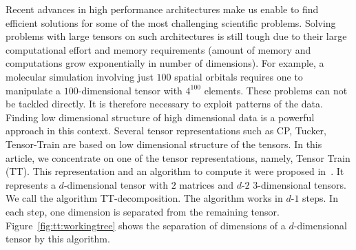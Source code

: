 \documentclass[sigconf]{acmart}
\begin{document}

Recent advances in high performance architectures make us enable to find efficient solutions for some of the most challenging scientific problems. Solving problems with large tensors on such architectures is still tough due to their large computational effort and memory requirements (amount of memory and computations grow exponentially in number of dimensions). For example, a molecular simulation involving just $100$ spatial orbitals requires one to manipulate a $100$-dimensional tensor with $4^{100}$ elements. These problems can not be tackled directly. It is therefore necessary to exploit patterns of the data. Finding low dimensional structure of high dimensional data is a powerful approach in this context. Several tensor representations such as CP, Tucker, Tensor-Train are based on low dimensional structure of the tensors. In this article, we concentrate on one of the tensor representations, namely, Tensor Train (TT). This representation and an algorithm to compute it were proposed in~\cite{tt}. It represents a $d$-dimensional tensor with $2$ matrices and $d$-$2$ 3-dimensional tensors. We call the algorithm TT-decomposition. The algorithm works in $d$-$1$ steps. In each step, one dimension is separated from the remaining tensor. Figure~\ref{fig:tt:workingtree} shows the separation of dimensions of a $d$-dimensional tensor by this algorithm.
\end{document}

